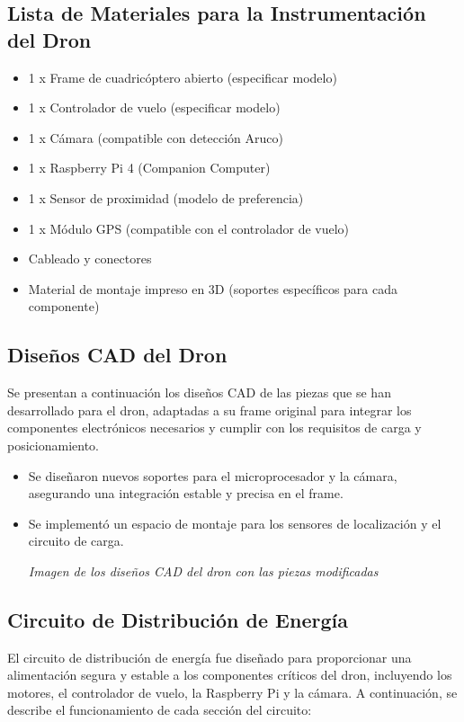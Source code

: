 \subsection{Lista de Materiales para la Instrumentación del Dron} 
    \begin{itemize} 
        \item 1 x Frame de cuadricóptero abierto (especificar modelo) 
        \item 1 x Controlador de vuelo (especificar modelo) 
        \item 1 x Cámara (compatible con detección Aruco) 
        \item 1 x Raspberry Pi 4 (Companion Computer) 
        \item 1 x Sensor de proximidad (modelo de preferencia) 
        \item 1 x Módulo GPS (compatible con el controlador de vuelo) 
        \item Cableado y conectores 
        \item Material de montaje impreso en 3D (soportes específicos para cada componente) 
    \end{itemize}

\subsection{Diseños CAD del Dron} 
Se presentan a continuación los diseños CAD de las piezas que se han desarrollado para el dron, adaptadas a su frame original para integrar los componentes electrónicos necesarios y cumplir con los requisitos de carga y posicionamiento.

    \begin{itemize} 
        \item Se diseñaron nuevos soportes para el microprocesador y la cámara, asegurando una integración estable y precisa en el frame. 
        \item Se implementó un espacio de montaje para los sensores de localización y el circuito de carga. 
        \begin{center} 
            \textit{Imagen de los diseños CAD del dron con las piezas modificadas} 
        \end{center} 
    \end{itemize}

    \subsection{Circuito de Distribución de Energía} 
    El circuito de distribución de energía fue diseñado para proporcionar una alimentación segura y estable a los componentes críticos del dron, incluyendo los motores, el controlador de vuelo, la Raspberry Pi y la cámara. A continuación, se describe el funcionamiento de cada sección del circuito:
    
